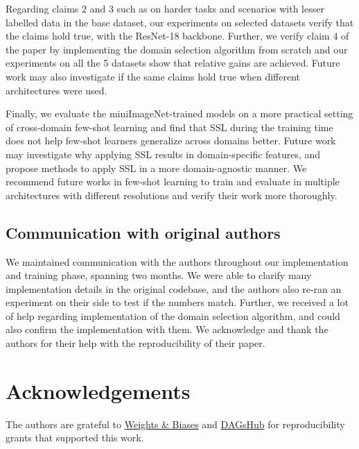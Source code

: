 Regarding claims $2$ and $3$ such as on harder tasks and scenarios with lesser labelled data in the base dataset, our experiments on selected datasets verify that the claims hold true, with the ResNet-18 backbone. Further, we verify claim $4$ of the paper by implementing the domain selection algorithm from scratch and our experiments on all the 5 datasets show that relative gains are achieved. Future work may also investigate if the same claims hold true when different architectures were used. 

Finally, we evaluate the miniImageNet-trained models on a more practical setting of cross-domain few-shot learning and find that SSL during the training time does not help few-shot learners generalize across domains better. Future work may investigate why applying SSL results in domain-specific features, and propose methods to apply SSL in a more domain-agnostic manner.  We recommend future works in few-shot learning to train and evaluate in multiple architectures with different resolutions and verify their work more thoroughly.

\subsection{Communication with original authors}

We maintained communication with the authors throughout our implementation and training phase, spanning two months. We were able to clarify many implementation details in the original codebase, and the authors also re-ran an experiment on their side to test if the numbers match. Further, we received a lot of help regarding implementation of the domain selection algorithm, and could also confirm the implementation with them. We acknowledge and thank the authors for their help with the reproducibility of their paper.

\section{Acknowledgements}

The authors are grateful to \href{https://wandb.ai/}{Weights \& Biases} and \href{https://dagshub.com/}{DAGsHub} for reproducibility grants that supported this work.

\newpage